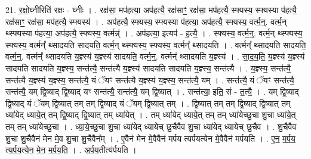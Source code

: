 \documentclass[17pt]{extarticle}
\begin{document}
21. र॒क्षो॒घ्नीरिति॑ रक्षः - घ्नीः । . रक्ष॑सा॒ मप॑हत्या॒ अप॑हत्यै॒ रक्ष॑साꣳ॒॒ रक्ष॑सा॒ मप॑हत्यै॒ स्फ्यस्य॒ स्फ्यस्या प॑हत्यै॒ रक्ष॑साꣳ॒॒ रक्ष॑सा॒ मप॑हत्यै॒ स्फ्यस्य॑ । . अप॑हत्यै॒ स्फ्यस्य॒ स्फ्यस्या प॑हत्या॒ अप॑हत्यै॒ स्फ्यस्य॒ वर्त्म॒न्॒. वर्त्म॒न् थ्स्फ्यस्या प॑हत्या॒ अप॑हत्यै॒ स्फ्यस्य॒ वर्त्मन्न्॑ । . अप॑हत्या॒ इत्यप॑ - ह॒त्यै॒ । . स्फ्यस्य॒ वर्त्म॒न्॒. वर्त्म॒न् थ्स्फ्यस्य॒ स्फ्यस्य॒ वर्त्मन्᳚ थ्सादयति सादयति॒ वर्त्म॒न् थ्स्फ्यस्य॒ स्फ्यस्य॒ वर्त्मन्᳚ थ्सादयति । . वर्त्मन्᳚ थ्सादयति सादयति॒ वर्त्म॒न्॒. वर्त्मन्᳚ थ्सादयति य॒ज्ञ्स्य॑ य॒ज्ञ्स्य॑ सादयति॒ वर्त्म॒न्॒. वर्त्मन्᳚ थ्सादयति य॒ज्ञ्स्य॑ । . सा॒द॒य॒ति॒ य॒ज्ञ्स्य॑ य॒ज्ञ्स्य॑ सादयति सादयति य॒ज्ञ्स्य॒ सन्त॑त्यै॒ सन्त॑त्यै य॒ज्ञ्स्य॑ सादयति सादयति य॒ज्ञ्स्य॒ सन्त॑त्यै । . य॒ज्ञ्स्य॒ सन्त॑त्यै॒ सन्त॑त्यै य॒ज्ञ्स्य॑ य॒ज्ञ्स्य॒ सन्त॑त्यै॒ यं ॅयꣳ सन्त॑त्यै य॒ज्ञ्स्य॑ य॒ज्ञ्स्य॒ सन्त॑त्यै॒ यम् । . सन्त॑त्यै॒ यं ॅयꣳ सन्त॑त्यै॒ सन्त॑त्यै॒ यम् द्वि॒ष्याद् द्वि॒ष्याद् यꣳ सन्त॑त्यै॒ सन्त॑त्यै॒ यम् द्वि॒ष्यात् । . सन्त॑त्या॒ इति॒ सं - त॒त्यै॒ । . यम् द्वि॒ष्याद् द्वि॒ष्याद् यं ॅयम् द्वि॒ष्यात् तम् तम् द्वि॒ष्याद् यं ॅयम् द्वि॒ष्यात् तम् । . द्वि॒ष्यात् तम् तम् द्वि॒ष्याद् द्वि॒ष्यात् तम् ध्या॑येद् ध्याये॒त् तम् द्वि॒ष्याद् द्वि॒ष्यात् तम् ध्या॑येत् । . तम् ध्या॑येद् ध्याये॒त् तम् तम् ध्या॑येच्छु॒चा शु॒चा ध्या॑ये॒त् तम् तम् ध्या॑येच्छु॒चा । . ध्या॒ये॒च्छु॒चा शु॒चा ध्या॑येद् ध्यायेच् छु॒चैवैव शु॒चा ध्या॑येद् ध्यायेच् छु॒चैव । . शु॒चैवैव शु॒चा शु॒चैवैन॑ मेन मे॒व शु॒चा शु॒चैवैन᳚म् । . ए॒वैन॑ मेन मे॒वैवैन॑ मर्पय त्यर्पयत्येन मे॒वैवैन॑ मर्पयति । . ए॒न॒ म॒र्प॒य॒ त्य॒र्प॒य॒त्ये॒न॒ मे॒न॒ म॒र्प॒य॒ति॒ । . अ॒र्प॒य॒तीत्य॑र्पयति । \newline
\pagebreak
{}
\end{document}
